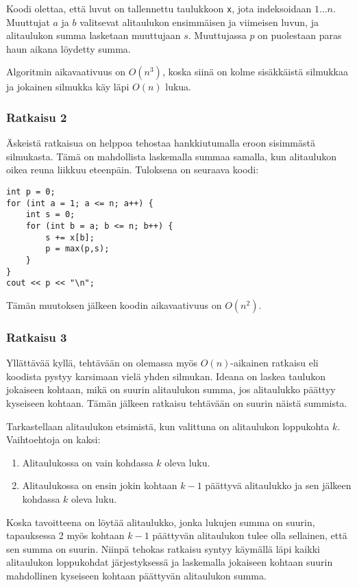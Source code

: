 Koodi olettaa, että luvut on tallennettu taulukkoon \texttt{x},
jota indeksoidaan $1 \ldots n$.
Muuttujat $a$ ja $b$ valitsevat alitaulukon ensimmäisen
ja viimeisen luvun, ja alitaulukon summa lasketaan muuttujaan $s$.
Muuttujassa $p$ on puolestaan paras haun aikana löydetty summa.

Algoritmin aikavaativuus on $O(n^3)$, koska siinä on kolme
sisäkkäistä silmukkaa ja jokainen silmukka käy läpi $O(n)$ lukua.

\subsubsection{Ratkaisu 2}

Äskeistä ratkaisua on helppoa tehostaa hankkiutumalla
eroon sisimmästä silmukasta.
Tämä on mahdollista laskemalla summaa samalla,
kun alitaulukon oikea reuna liikkuu eteenpäin.
Tuloksena on seuraava koodi:

\begin{lstlisting}
int p = 0;
for (int a = 1; a <= n; a++) {
    int s = 0;
    for (int b = a; b <= n; b++) {
        s += x[b];
        p = max(p,s);
    }
}
cout << p << "\n";
\end{lstlisting}
Tämän muutoksen jälkeen koodin aikavaativuus on $O(n^2)$.

\subsubsection{Ratkaisu 3}

Yllättävää kyllä, tehtävään on olemassa myös
$O(n)$-aikainen ratkaisu eli koodista pystyy
karsimaan vielä yhden silmukan.
Ideana on laskea taulukon jokaiseen
kohtaan, mikä on suurin alitaulukon
summa, jos alitaulukko päättyy kyseiseen kohtaan.
Tämän jälkeen ratkaisu tehtävään on suurin
näistä summista.

Tarkastellaan alitaulukon etsimistä,
kun valittuna on alitaulukon loppukohta $k$.
Vaihtoehtoja on kaksi:
\begin{enumerate}
\item Alitaulukossa on vain kohdassa $k$ oleva luku.
\item Alitaulukossa on ensin jokin kohtaan $k-1$ päättyvä alitaulukko
ja sen jälkeen kohdassa $k$ oleva luku.
\end{enumerate}

Koska tavoitteena on löytää alitaulukko,
jonka lukujen summa on suurin,
tapauksessa 2 myös kohtaan $k-1$ päättyvän
alitaulukon tulee olla sellainen,
että sen summa on suurin.
Niinpä tehokas ratkaisu syntyy käymällä läpi
kaikki alitaulukon loppukohdat järjestyksessä
ja laskemalla jokaiseen kohtaan suurin
mahdollinen kyseiseen kohtaan päättyvän alitaulukon summa.

